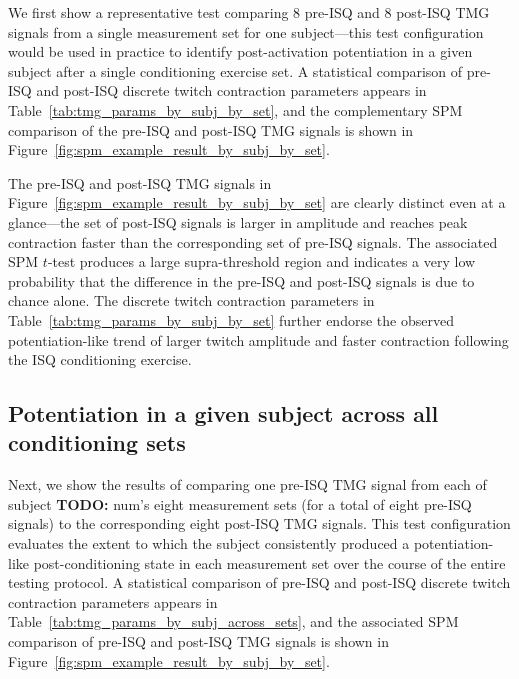 \documentclass[utf8]{style/FrontiersinHarvard}
\newcommand{\TODO}[1]{{\textbf{TODO:} {\color{red} #1}}}
\begin{document}
We first show a representative test comparing 8 pre-ISQ and 8 post-ISQ TMG signals from a single measurement set for one subject---this test configuration would be used in practice to identify post-activation potentiation in a given subject after a single conditioning exercise set.
A statistical comparison of pre-ISQ and post-ISQ discrete twitch contraction parameters appears in Table~\ref{tab:tmg_params_by_subj_by_set},
and the complementary SPM comparison of the pre-ISQ and post-ISQ TMG signals is shown in Figure~\ref{fig:spm_example_result_by_subj_by_set}.

The pre-ISQ and post-ISQ TMG signals in Figure~\ref{fig:spm_example_result_by_subj_by_set} are clearly distinct even at a glance---the set of post-ISQ signals is larger in amplitude and reaches peak contraction faster than the corresponding set of pre-ISQ signals.
The associated SPM $ t $-test produces a large supra-threshold region and indicates a very low probability that the difference in the pre-ISQ and post-ISQ signals is due to chance alone.
The discrete twitch contraction parameters in Table~\ref{tab:tmg_params_by_subj_by_set} further endorse the observed potentiation-like trend of larger twitch amplitude and faster contraction following the ISQ conditioning exercise.

\begin{table}[htb!]
    \centering
    \caption{A statistical comparison of pre- and post-ISQ TMG parameters from subject \TODO{number}'s measurement set 1.
    The twitch contraction parameters in each row were defined in Section~\ref{sss:discrete_twitch_params}.
    The columns $ \mu_{\mathrm{pre}} $ and $ \mu_{\mathrm{post}} $ show the mean value of each parameter across all eight measurements in the set, and $ \sigma_{\mathrm{pre}} $ and $ \sigma_{\mathrm{post}} $ show the corresponding standard deviations.
    The $ \lvert t \rvert $ column shows the $ t $-statistic from a paired, two-tailed Student's $ t $-test comparing the (pre-ISQ, post-ISQ) pairs for each parameter, and the $ p $ column shows the associated $ p $ value.}
    \vspace{1ex}
    \renewcommand{\arraystretch}{1.2}
    
    \label{tab:tmg_params_by_subj_by_set}
\end{table}

\subsection{Potentiation in a given subject across all conditioning sets}
Next, we show the results of comparing one pre-ISQ TMG signal from each of subject \TODO{num}'s eight measurement sets (for a total of eight pre-ISQ signals) to the corresponding eight post-ISQ TMG signals.
This test configuration evaluates the extent to which the subject consistently produced a potentiation-like post-conditioning state in each measurement set over the course of the entire testing protocol.
A statistical comparison of pre-ISQ and post-ISQ discrete twitch contraction parameters appears in Table~\ref{tab:tmg_params_by_subj_across_sets},
and the associated SPM comparison of pre-ISQ and post-ISQ TMG signals is shown in Figure~\ref{fig:spm_example_result_by_subj_by_set}.
\end{document}
